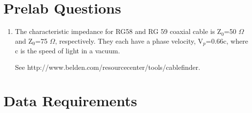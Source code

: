 \section{Prelab Questions}
\begin{enumerate}
\item The characteristic impedance for RG58 and RG 59 coaxial cable is Z$_0$=50 $\Omega$ and Z$_0$=75 $\Omega$, respectively. They each have a phase velocity, V$_p$=0.66c, where c is the speed of light in a vacuum.

See http://www.belden.com/resourcecenter/tools/cablefinder.
\end{enumerate}



\section{Data Requirements}
